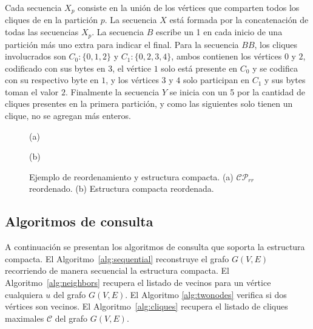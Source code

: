 Cada secuencia $X_{p}$ consiste en la unión de los vértices que comparten todos los cliques de en la partición $p$. La secuencia $X$ está formada por la concatenación de todas las secuencias $X_{p}$. La secuencia $B$ escribe un 1 en cada inicio de una partición más uno extra para indicar el final. Para la secuencia $BB$, los cliques involucrados son $C_{0}: \{0, 1, 2\}$ y $C_{1}: \{0, 2, 3, 4\}$, ambos contienen los vértices $0$ y $2$, codificado con sus bytes en $3$, el vértice $1$ solo está presente en $C_{0}$ y se codifica con su respectivo byte en $1$, y los vértices $3$ y $4$ solo participan en $C_{1}$ y sus bytes toman el valor $2$. Finalmente la secuencia $Y$ se inicia con un  5 por la cantidad de cliques presentes en la primera partición, y como las siguientes solo tienen un clique, no se agregan más enteros.

\begin{figure}
	\centering
	\begin{minipage}{0.45\textwidth}
		\centering
		
	
		(a)
	\end{minipage}
	\begin{minipage}{0.45\textwidth}
		\centering
		
		
		(b)
	\end{minipage}
	
	\caption{Ejemplo de reordenamiento y estructura compacta. (a) $\mathcal{C}\mathcal{P}_{rr}$ reordenado. (b) Estructura compacta reordenada.}
	\label{fig:compactStructure}
\end{figure}



\subsection{Algoritmos de consulta}
A continuación se presentan los algoritmos de consulta que soporta la estructura compacta. El Algoritmo~\ref{alg:sequential} reconstruye el grafo $G(V, E)$ recorriendo de manera secuencial la estructura compacta. El Algoritmo~\ref{alg:neighbors} recupera el listado de vecinos para un vértice cualquiera $u$ del grafo $G(V, E)$. El Algoritmo \ref{alg:twonodes} verifica si dos vértices son vecinos. El Algoritmo~\ref{alg:cliques} recupera el listado de cliques maximales $\mathcal{C}$ del grafo $G(V, E)$.

